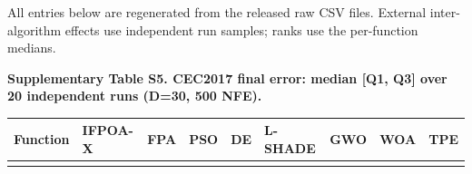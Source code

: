 \documentclass[
  9pt,
]{extarticle}
\newcounter{none} %
\begin{document}
All entries below are regenerated from the released raw CSV files.
External inter-algorithm effects use independent run samples; ranks use
the per-function medians.

\textbf{Supplementary Table S5. CEC2017 final error: median {[}Q1, Q3{]}
over 20 independent runs (D=30, 500 NFE).}

{\def\LTcaptype{none} %
\begin{longtable}[]{@{}
  >{\raggedright\arraybackslash}p{}
  >{\raggedright\arraybackslash}p{}
  >{\raggedright\arraybackslash}p{}
  >{\raggedright\arraybackslash}p{}
  >{\raggedright\arraybackslash}p{}
  >{\raggedright\arraybackslash}p{}
  >{\raggedright\arraybackslash}p{}
  >{\raggedright\arraybackslash}p{}
  >{\raggedright\arraybackslash}p{}@{}}
\toprule\noalign{}
\begin{minipage}[b]{\linewidth}\raggedright
Function
\end{minipage} & \begin{minipage}[b]{\linewidth}\raggedright
IFPOA-X
\end{minipage} & \begin{minipage}[b]{\linewidth}\raggedright
FPA
\end{minipage} & \begin{minipage}[b]{\linewidth}\raggedright
PSO
\end{minipage} & \begin{minipage}[b]{\linewidth}\raggedright
DE
\end{minipage} & \begin{minipage}[b]{\linewidth}\raggedright
L-SHADE
\end{minipage} & \begin{minipage}[b]{\linewidth}\raggedright
GWO
\end{minipage} & \begin{minipage}[b]{\linewidth}\raggedright
WOA
\end{minipage} & \begin{minipage}[b]{\linewidth}\raggedright
TPE
\end{minipage} \\
\midrule\noalign{}
\endhead
\bottomrule\noalign{}

\end{longtable}}
\end{document}
